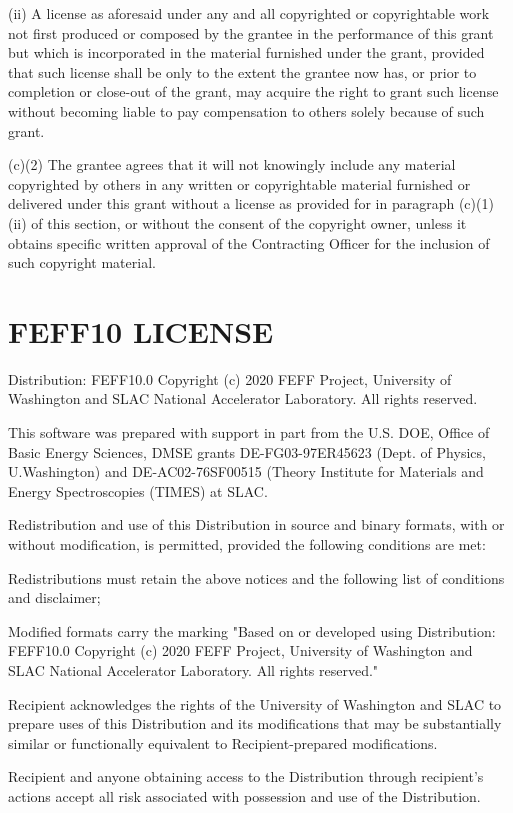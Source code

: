 \documentclass[11pt,oneside]{report} %
\begin{document}
\begin{latexonly}
(ii) A license as aforesaid under any and all copyrighted or
copyrightable work not first produced or composed by the grantee in the
performance of this grant but which is incorporated in the material
furnished under the grant, provided that such license shall be only to
the extent the grantee now has, or prior to completion or close-out of
the grant, may acquire the right to grant such license without becoming
liable to pay compensation to others solely because of such grant.

(c)(2) The grantee agrees that it will not knowingly include any
material copyrighted by others in any written or copyrightable material
furnished or delivered under this grant without a license as provided
for in paragraph (c)(1)(ii) of this section, or without the consent of
the copyright owner, unless it obtains specific written approval of the
Contracting Officer for the inclusion of such copyright material.

\section{FEFF10 LICENSE}
\label{sec:F10license}


Distribution:  FEFF10.0
Copyright (c) 2020 FEFF Project, University of Washington and
SLAC National Accelerator Laboratory.  All rights reserved.  
 
This software was prepared with support in part from the U.S. DOE,
Office of Basic Energy Sciences, DMSE grants DE-FG03-97ER45623
(Dept. of Physics, U.Washington) and DE-AC02-76SF00515 (Theory
Institute for Materials and Energy Spectroscopies (TIMES) at SLAC. 

Redistribution and use of this Distribution in source and binary
formats, with or without modification, is permitted, provided the 
following conditions are met:

Redistributions must retain the above notices and the following list
of conditions and disclaimer;

Modified formats carry the marking
    "Based on or developed using Distribution: FEFF10.0
Copyright (c) 2020 FEFF Project, University of Washington and
SLAC National Accelerator Laboratory.  All rights reserved." 

Recipient acknowledges the rights of the University of Washington
and SLAC to prepare uses of this Distribution and its modifications that
may be substantially similar or functionally equivalent to
Recipient-prepared modifications.

Recipient and anyone obtaining access to the Distribution through
recipient's actions accept all risk associated with possession and
use of the Distribution.


\end{latexonly}
\end{document}
